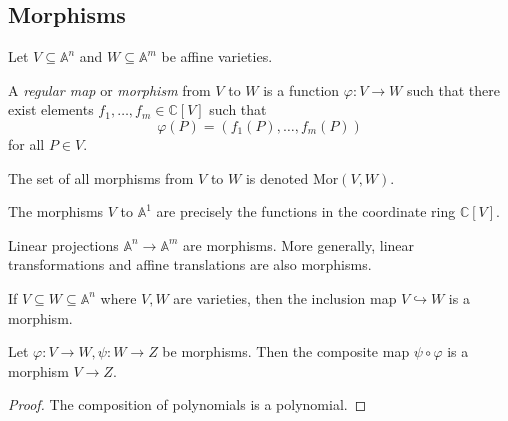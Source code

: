 \subsection{Morphisms}
Let \( V \subseteq \mathbb A^n \) and \( W \subseteq \mathbb A^m \) be affine varieties.
\begin{definition}
    A \emph{regular map} or \emph{morphism} from \( V \) to \( W \) is a function \( \varphi \colon V \to W \) such that there exist elements \( f_1, \dots, f_m \in \mathbb C[V] \) such that
    \[ \varphi(P) = (f_1(P), \dots, f_m(P)) \]
    for all \( P \in V \).
\end{definition}
The set of all morphisms from \( V \) to \( W \) is denoted \( \mathrm{Mor}(V,W) \).
\begin{example}
    The morphisms \( V \) to \( \mathbb A^1 \) are precisely the functions in the coordinate ring \( \mathbb C[V] \).
\end{example}
\begin{example}
    Linear projections \( \mathbb A^n \to \mathbb A^m \) are morphisms.
    More generally, linear transformations and affine translations are also morphisms.
\end{example}
\begin{example}
    If \( V \subseteq W \subseteq \mathbb A^n \) where \( V, W \) are varieties, then the inclusion map \( V \hookrightarrow W \) is a morphism.
\end{example}
\begin{proposition}
    Let \( \varphi \colon V \to W, \psi \colon W \to Z \) be morphisms.
    Then the composite map \( \psi \circ \varphi \) is a morphism \( V \to Z \).
\end{proposition}
\begin{proof}
    The composition of polynomials is a polynomial.
\end{proof}

